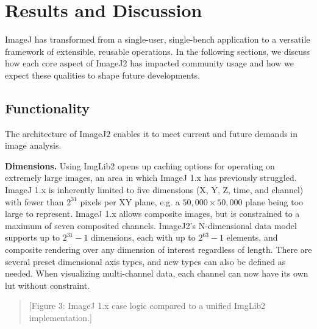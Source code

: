 \documentclass{bmcart}
\begin{document}

\section*{Results and Discussion}
ImageJ has transformed from a single-user, single-bench application to a
versatile framework of extensible, reusable operations. In the following
sections, we discuss how each core aspect of ImageJ2 has impacted community
usage and how we expect these qualities to shape future developments.

\subsection*{Functionality}

The architecture of ImageJ2 enables it to meet current and future demands in
image analysis.

\textbf{Dimensions.} Using ImgLib2 opens up caching options for operating on
extremely large images, an area in which ImageJ 1.x has previously struggled.
ImageJ 1.x is inherently limited to five dimensions (X, Y, Z, time, and
channel) with fewer than $2^{31}$ pixels per XY plane, e.g. a $50,000 \times
50,000$ plane being too large to represent. ImageJ 1.x allows composite images,
but is constrained to a maximum of seven composited channels. ImageJ2's
N-dimensional data model supports up to $2^{31} - 1$ dimensions, each with up
to $2^{63} - 1$ elements, and composite rendering over any dimension of
interest regardless of length. There are several preset dimensional axis types,
and new types can also be defined as needed. When visualizing multi-channel
data, each channel can now have its own \acrfull{lut} without constraint.

\begin{quote}
[Figure 3: ImageJ 1.x case logic compared to a unified ImgLib2 implementation.]
\end{quote}
\end{document}
